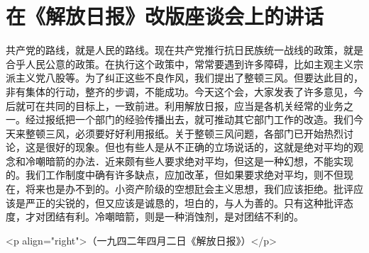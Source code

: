 \section[在《解放日报》改版座谈会上的讲话（一九四二年）]{在《解放日报》改版座谈会上的讲话}

共产党的路线，就是人民的路线。现在共产党推行抗日民族统一战线的政策，就是合乎人民公意的政策。在执行这个政策中，常常要遇到许多障碍，比如主观主义宗派主义党八股等。为了纠正这些不良作风，我们提出了整顿三风。但要达此目的，非有集体的行动，整齐的步调，不能成功。今天这个会，大家发表了许多意见，今后就可在共同的目标上，一致前进。利用解放日报，应当是各机关经常的业务之一。经过报纸把一个部门的经验传播出去，就可推动其它部门工作的改造。我们今天来整顿三风，必须要好好利用报纸。关于整顿三风问题，各部门已开始热烈讨论，这是很好的现象。但也有些人是从不正确的立场说话的，这就是绝对平均的观念和冷嘲暗箭的办法．近来颇有些人要求绝对平均，但这是一种幻想，不能实现的。我们工作制度中确有许多缺点，应加改革，但如果要求绝对平均，则不但现在，将来也是办不到的。小资产阶级的空想瓧会主义思想，我们应该拒绝。批评应该是严正的尖锐的，但又应该是诚恳的，坦白的，与人为善的。只有这种批评态度，才对团结有利。冷嘲暗箭，则是一种消蚀剂，是对团结不利的。

<p align="right">（一九四二年四月二日《解放日报》）</p>

